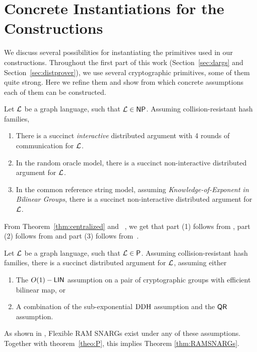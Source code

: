 \section{Concrete Instantiations for the Constructions }\label{app:concrete}
We discuss several possibilities for instantiating the primitives used in our constructions. Throughout the first part of this work (Section~\ref{sec:dargs} and Section~\ref{sec:distprover}), we use several cryptographic primitives, some of them quite strong. Here we refine them and show from which concrete assumptions each of them can be constructed. 

\begin{theorem}\label{thm:concDargs}
    Let $\mathcal{L}$ be a graph language, such that $\mathcal{L}\in {\mathsf{NP}}$. Assuming collision-resistant hash families,
    \begin{enumerate}
        \item There is a succinct \emph{interactive} distributed argument with 4 rounds of communication for $\mathcal{L}$. 
        \item In the random oracle model, there is a succinct non-interactive distributed argument for $\mathcal{L}$.
        \item In the common reference string model, assuming \emph{Knowledge-of-Exponent in Bilinear Groups}, there is a succinct non-interactive distributed argument for $\mathcal{L}$. 
    \end{enumerate}
\end{theorem}
From Theorem~\ref{thm:centralized} and ~\cite{merkle1989certified}, we get that part (1) follows from \cite{kilian1992note}, part (2) follows from \cite{micali2000computationally} and part (3) follows from~\cite{bitansky2013SNARKsLIPs}.

\begin{theorem}\label{thm:RAMSNARGs}
    Let $\mathcal{L}$ be a graph language, such that $\mathcal{L}\in {\mathsf{P}}$. Assuming collision-resistant hash families, there is a succinct distributed argument for $\mathcal{L}$, assuming either
    \begin{enumerate}
        \item The $O(1)-\mathsf{LIN}$ assumption on a pair of cryptographic groups with efficient bilinear map, or
        \item A combination of the sub-exponential $\mathrm{DDH}$ assumption and the $\mathsf{QR}$ assumption.
    \end{enumerate}
\end{theorem}
As shown in  \cite{cryptoeprint:2022/1320}, Flexible RAM SNARGs exist under any of these assumptions. Together with theorem~\ref{theo:P}, this implies Theorem \ref{thm:RAMSNARGs}.

